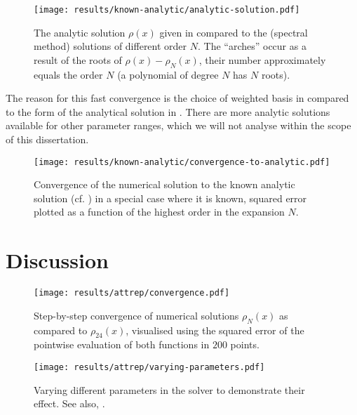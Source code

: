 \begin{figure}[H]
  \centering
  \texttt{[image: results/known-analytic/analytic-solution.pdf]}
  \caption[Comparison with analytical solutions and error]{
    The analytic solution $\rho(x)$ given in  compared to the (spectral method) solutions of different order $N$.
    The ``arches'' occur as a result of the roots of $\rho(x) - \rho_N(x)$, their number approximately equals the order $N$ (a polynomial of degree $N$ has $N$ roots).
  }
  \label{fig:analytic-solution}
\end{figure}

The reason for this fast convergence is the choice of weighted basis in  compared to the form of the analytical solution in .
There are more analytic solutions available for other parameter ranges, which we will not analyse within the scope of this dissertation.



\begin{figure}[H]
  \centering
  \texttt{[image: results/known-analytic/convergence-to-analytic.pdf]}
  \caption[Convergence to analytic solution]{Convergence of the numerical solution to the known analytic solution (cf. ) in a special case where it is known, squared error plotted as a function of the highest order in the expansion $N$.}
  \label{fig:convergence-to-analytic}
\end{figure}

\section{Discussion}
\begin{figure}[H]
  \centering
  \texttt{[image: results/attrep/convergence.pdf]}
  \caption[Step-by-step convergence of solutions compared to order 24]{Step-by-step convergence of numerical solutions $\rho_N(x)$ as compared to $\rho_{24}(x)$, visualised using the squared error of the pointwise evaluation of both functions in $200$ points.}
  \label{fig:convergence}
\end{figure}

\begin{figure}[H]
  \centering
  \texttt{[image: results/attrep/varying-parameters.pdf]}
  \caption[Varying parameters in the solver]{
    Varying different parameters in the solver to demonstrate their effect.
    See also, .
  }
  \label{fig:varying-parameters}
\end{figure}
